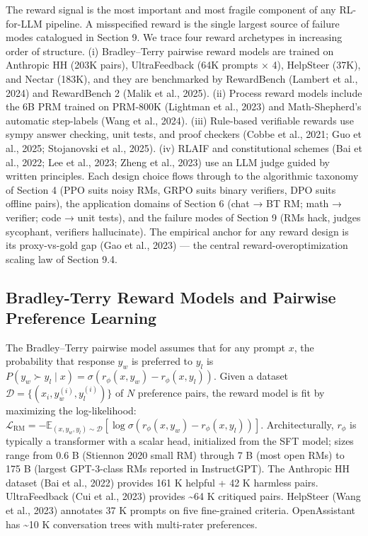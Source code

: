 The reward signal is the most important and most fragile component of any RL-for-LLM pipeline. A misspecified reward is the single largest source of failure modes catalogued in Section 9. We trace four reward archetypes in increasing order of structure. (i) Bradley--Terry pairwise reward models are trained on Anthropic HH (203K pairs), UltraFeedback (64K prompts × 4), HelpSteer (37K), and Nectar (183K), and they are benchmarked by RewardBench (Lambert et al., 2024) and RewardBench 2 (Malik et al., 2025). (ii) Process reward models include the 6B PRM trained on PRM-800K (Lightman et al., 2023) and Math-Shepherd's automatic step-labels (Wang et al., 2024). (iii) Rule-based verifiable rewards use sympy answer checking, unit tests, and proof checkers (Cobbe et al., 2021; Guo et al., 2025; Stojanovski et al., 2025). (iv) RLAIF and constitutional schemes (Bai et al., 2022; Lee et al., 2023; Zheng et al., 2023) use an LLM judge guided by written principles. Each design choice flows through to the algorithmic taxonomy of Section 4 (PPO suits noisy RMs, GRPO suits binary verifiers, DPO suits offline pairs), the application domains of Section 6 (chat → BT RM; math → verifier; code → unit tests), and the failure modes of Section 9 (RMs hack, judges sycophant, verifiers hallucinate). The empirical anchor for any reward design is its proxy-vs-gold gap (Gao et al., 2023) --- the central reward-overoptimization scaling law of Section 9.4.

\subsection{Bradley-Terry Reward Models and Pairwise Preference Learning}\label{bradley-terry-reward-models-and-pairwise-preference-learning}

The Bradley--Terry pairwise model assumes that for any prompt \(x\), the probability that response \(y_w\) is preferred to \(y_l\) is \(P(y_w \succ y_l \mid x) = \sigma(r_\phi(x, y_w) - r_\phi(x, y_l))\). Given a dataset \(\mathcal{D} = \{(x_i, y_w^{(i)}, y_l^{(i)})\}\) of \(N\) preference pairs, the reward model is fit by maximizing the log-likelihood: \(\mathcal{L}_{\mathrm{RM}} = -\mathbb{E}_{(x, y_w, y_l) \sim \mathcal{D}}[\log \sigma(r_\phi(x, y_w) - r_\phi(x, y_l))]\). Architecturally, \(r_\phi\) is typically a transformer with a scalar head, initialized from the SFT model; sizes range from 0.6 B (Stiennon 2020 small RM) through 7 B (most open RMs) to 175 B (largest GPT-3-class RMs reported in InstructGPT). The Anthropic HH dataset (Bai et al., 2022) provides 161 K helpful + 42 K harmless pairs. UltraFeedback (Cui et al., 2023) provides \textasciitilde64 K critiqued pairs. HelpSteer (Wang et al., 2023) annotates 37 K prompts on five fine-grained criteria. OpenAssistant has \textasciitilde10 K conversation trees with multi-rater preferences.

